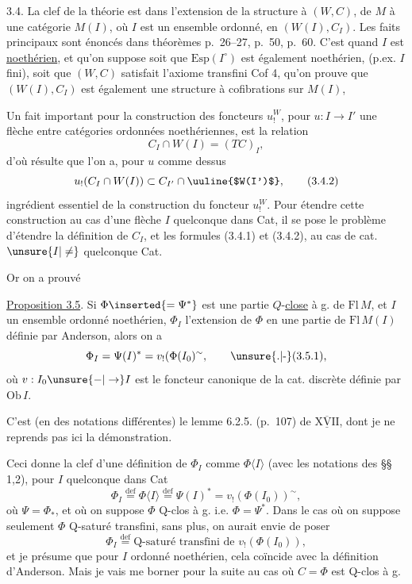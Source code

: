 3.4. La clef de la théorie est dans l'extension
de la structure à  $(W,C)$, de $M$
à une catégorie $M(I)$, où $I$ est un ensemble
ordonné, en $(W(I),C_I)$. Les faits principaux
sont énoncés dans   théorèmes p.~26--27, p.~50, p.~60.
C'est quand $I$ est \uline{noethérien}, et qu'on suppose
soit que $\mathrm{Esp}(I^\circ)$ est également noethérien, (p.ex.
$I$ fini), soit que $(W,C)$ satisfait l'axiome
transfini Cof 4, qu'on prouve que $(W(I),C_I)$
est également une structure à cofibrations sur $M(I)$,

Un fait important pour la construction des
foncteurs $u^{W}_{!}$, pour  $u:I\longrightarrow I'$ une flèche
entre catégories ordonnées noethériennes, est
la relation
\[
 C_I\cap W(I)=(TC)_I,\tag*{(3.4.1)}
\]
d'où résulte que l'on a, pour $u$ comme dessus
\[
 u_!(C_I\cap W(I))\subset C_{I'}\cap\text{\uuline{$W(I')$}},\tag*{(3.4.2)}
\]
ingrédient essentiel de la construction du
foncteur $u^{W}_{!}$. Pour étendre cette construction
au cas d'une flèche $I$ quelconque dans Cat,
il se pose  le problème d'étendre la
définition de $C_I$, et les formules (3.4.1) et
(3.4.2), au cas de cat. $\unsure{I|\ne}$ quelconque  Cat.

Or on a prouvé

\uline{Proposition 3.5}. Si $\Phi\inserted{=\Psi^*}$ est une partie $Q$-\uline{close} à g.
de $\mathrm{Fl}\,M$,  et $I$ un ensemble ordonné
noethérien, $\Phi_I$ l'extension de $\Phi$ en une partie
de $\mathrm{Fl}\,M(I)$ définie par Anderson, alors on a
\[
 \Phi_I=\Psi(I)^*=v_!(\Phi(I_0)^{\sim},\tag*{\unsure{.|-}(3.5.1),}
\]
où $v:I_0\unsure{-|\to}I$ est le foncteur canonique de
la cat. discrète définie par $\mathrm{Ob}\,I$.

C'est (en des notations différentes) le
lemme 6.2.5. (p.~107) de $\underline{\overline{\mathrm{XVII}}}$, dont je ne
reprends pas ici la démonstration.

Ceci donne la clef d'une définition de $\Phi_I$
comme $\Phi\langle I\rangle$ (avec les notations des \S\S\,1,2),
pour $I$ quelconque dans Cat
\[
 \Phi_I\overset{\mathrm{def}}{=}\Phi\langle I\rangle\overset{\mathrm{def}}{=}\Psi(I)^*=v_!(\Phi(I_0))^{\sim},\tag*{(3.5.2)}
\]
où $\Psi=\Phi_*$, et où on suppose $\Phi$ Q-clos à g. i.e.
$\Phi=\Psi^*$. Dans le cas où on suppose
seulement $\Phi$ Q-saturé transfini, sans plus,
on aurait envie de poser
\[
 \Phi_I\overset{\mathrm{def}}{=}\text{Q-saturé transfini de }v_!(\Phi(I_0)),\tag*{(3.5.3)}
\]
et je présume que pour $I$ ordonné noethérien,
cela coïncide avec la définition d'Anderson.
Mais je vais me borner pour la suite au cas où
$C=\Phi$ est Q-clos à g.

